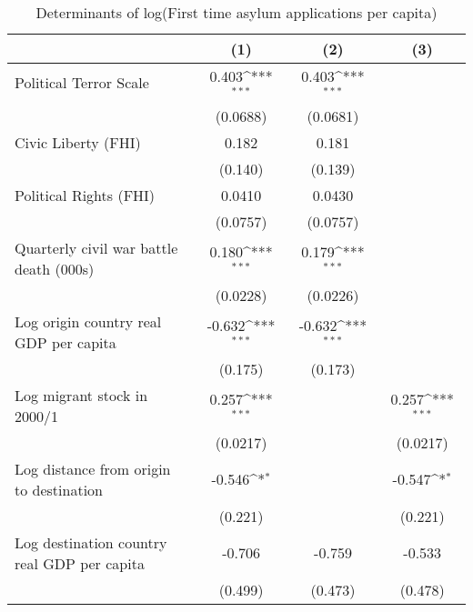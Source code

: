 \begin{table}[htbp]\centering
\def\sym#1{\ifmmode^{#1}\else\(^{#1}\)\fi}
\caption{Determinants of log(First time asylum applications per capita)}
\begin{tabular}{l*{3}{c}}
\hline\hline
                    &\multicolumn{1}{c}{(1)}         &\multicolumn{1}{c}{(2)}         &\multicolumn{1}{c}{(3)}         \\
\hline
Political Terror Scale&       0.403\sym{***}&       0.403\sym{***}&                     \\
                    &    (0.0688)         &    (0.0681)         &                     \\
[1em]
Civic Liberty (FHI) &       0.182         &       0.181         &                     \\
                    &     (0.140)         &     (0.139)         &                     \\
[1em]
Political Rights (FHI)&      0.0410         &      0.0430         &                     \\
                    &    (0.0757)         &    (0.0757)         &                     \\
[1em]
Quarterly civil war battle death (000s)&       0.180\sym{***}&       0.179\sym{***}&                     \\
                    &    (0.0228)         &    (0.0226)         &                     \\
[1em]
Log origin country real GDP per capita&      -0.632\sym{***}&      -0.632\sym{***}&                     \\
                    &     (0.175)         &     (0.173)         &                     \\
[1em]
Log migrant stock in 2000/1&       0.257\sym{***}&                     &       0.257\sym{***}\\
                    &    (0.0217)         &                     &    (0.0217)         \\
[1em]
Log distance from origin to destination&      -0.546\sym{*}  &                     &      -0.547\sym{*}  \\
                    &     (0.221)         &                     &     (0.221)         \\
[1em]
Log destination country real GDP per capita&      -0.706         &      -0.759         &      -0.533         \\
                    &     (0.499)         &     (0.473)         &     (0.478)         \\

\end{tabular}
\end{table}
